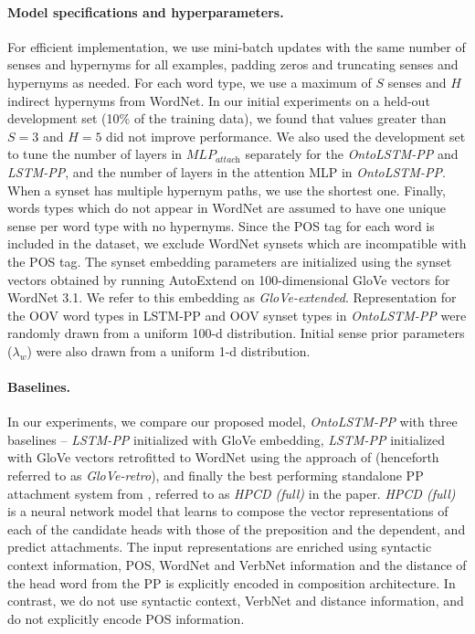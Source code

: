 \paragraph{Model specifications and hyperparameters.} 
For efficient implementation, we use mini-batch updates with the same number of senses and hypernyms for all examples, padding zeros and truncating senses and hypernyms as needed.
For each word type, we use a maximum of $S$ senses and $H$ indirect hypernyms from WordNet.
In our initial experiments on a held-out development set (10\% of the training data), we found that values greater than $S=3$ and $H=5$ did not improve performance. We also used the development set to tune the number of layers in $\textit{MLP}_{\textit{attach}}$ separately for the \textit{OntoLSTM-PP} and \textit{LSTM-PP}, and the number of layers in the attention MLP in \textit{OntoLSTM-PP}.
When a synset has multiple hypernym paths, we use the shortest one. 
Finally, words types which do not appear in WordNet are assumed to have one unique sense per word type with no hypernyms. Since the POS tag for each word is included in the dataset, we exclude WordNet synsets which are incompatible with the POS tag.
The synset embedding parameters are initialized using the synset vectors obtained by running AutoExtend \citep{rothe:15} on 100-dimensional GloVe \citep{pennington2014glove} vectors for WordNet 3.1. We refer to this embedding as \textit{GloVe-extended}. Representation for the OOV word types in LSTM-PP and OOV synset types in \textit{OntoLSTM-PP} were randomly drawn from a uniform 100-d distribution. 
Initial sense prior parameters ($\lambda_w$) were also drawn from a uniform 1-d distribution.

\paragraph{Baselines.} In our experiments, we compare our proposed model, \textit{OntoLSTM-PP} with three baselines -- \textit{LSTM-PP} initialized with GloVe embedding, \textit{LSTM-PP} initialized with GloVe vectors retrofitted to WordNet using the approach of \cite{faruqui:15} (henceforth referred to as \textit{GloVe-retro}), and finally the best performing standalone PP attachment system from \cite{belinkov2014exploring}, referred to as \textit{HPCD (full)} in the paper. \textit{HPCD (full)} is a neural network model that learns to compose the vector representations of each of the candidate heads with those of the preposition and the dependent, and predict attachments. The input representations are enriched using syntactic context information, POS, WordNet and VerbNet \cite{kipper2008large} information and the distance of the head word from the PP is explicitly encoded in composition architecture. In contrast, we do not use syntactic context, VerbNet and distance information, and do not explicitly encode POS information.

